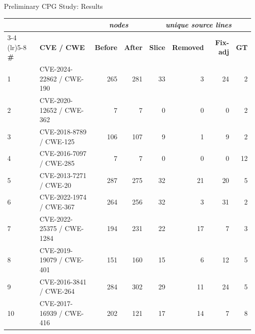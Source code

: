 \documentclass[aspectratio=169,10pt]{beamer}
\begin{document}
\begin{frame}{Preliminary CPG Study: Results}

  \centering
  \vspace{0.2em}
  {\scriptsize
  \renewcommand{\arraystretch}{1.3}
  \setlength{\tabcolsep}{3.5pt}
  \begin{tabular}{llrr|rrrr}
    \toprule
    & & \multicolumn{2}{c|}{\textit{nodes}} & \multicolumn{4}{c}{\textit{unique source lines}} \\
    \cmidrule(lr){3-4} \cmidrule(lr){5-8}
    \textbf{\#} & \textbf{CVE / CWE} & \textbf{Before} & \textbf{After}
      & \textbf{Slice} & \textbf{Removed} & \textbf{Fix-adj} & \textbf{GT} \\
    \midrule
    1 & CVE-2024-22862 / CWE-190 & 265 & 281 & 33 & 3 & 24 & 2 \\
    2 & CVE-2020-12652 / CWE-362 & 7 & 7 & 0 & 0 & 0 & 2 \\
    3 & CVE-2018-8789 / CWE-125  & 106 & 107 & 9 & 1 & 9 & 2 \\
    4 & CVE-2016-7097 / CWE-285  & 7 & 7 & 0 & 0 & 0 & 12 \\
    5 & CVE-2013-7271 / CWE-20   & 287 & 275 & 32 & 21 & 20 & 5 \\
    6 & CVE-2022-1974 / CWE-367  & 264 & 256 & 32 & 3 & 31 & 2 \\
    7 & CVE-2022-25375 / CWE-1284 & 194 & 231 & 22 & 17 & 7 & 3 \\
    8 & CVE-2019-19079 / CWE-401 & 151 & 160 & 15 & 6 & 12 & 5 \\
    9 & CVE-2016-3841 / CWE-264  & 284 & 302 & 29 & 11 & 24 & 5 \\
    10 & CVE-2017-16939 / CWE-416 & 202 & 121 & 17 & 14 & 7 & 8 \\
    \bottomrule
  \end{tabular}}


\end{frame}
\end{document}
